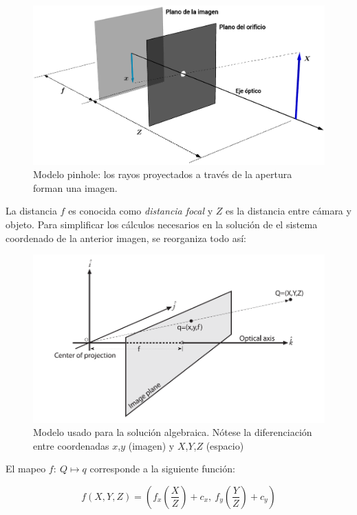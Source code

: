 \documentclass[12pt]{article}
\makeatletter
\def\maxwidth{\ifdim\Gin@nat@width>\linewidth\linewidth
    \else\Gin@nat@width\fi}
\let\Oldincludegraphics\includegraphics
\renewcommand{\includegraphics}[1]{\Oldincludegraphics[width=.8\maxwidth]{#1}}
\makeatother
\begin{document}
    \begin{figure}[htbp]
\centering
\includegraphics{img/1-fig1.png}
\caption{Modelo pinhole: los rayos proyectados a través de la apertura
forman una imagen.}
\end{figure}

    La distancia \(f\) es conocida como \emph{distancia focal} y \(Z\) es la
distancia entre cámara y objeto. Para simplificar los cálculos
necesarios en la solución de el sistema coordenado de la anterior
imagen, se reorganiza todo así:

    \begin{figure}[htbp]
\centering
\includegraphics{img/1-fig2.png}
\caption{Modelo usado para la solución algebraica. Nótese la
diferenciación entre coordenadas \(x\),\(y\) (imagen) y
\(X\),\(Y\),\(Z\) (espacio)}
\end{figure}

    El mapeo \(f:\ Q \mapsto q\) corresponde a la siguiente función:

    \[f\left(X,Y,Z\right) = \left(f_x\left(\frac{X}{Z}\right)+c_x,\ f_y\left(\frac{Y}{Z}\right)+c_y\right)\]
\end{document}
